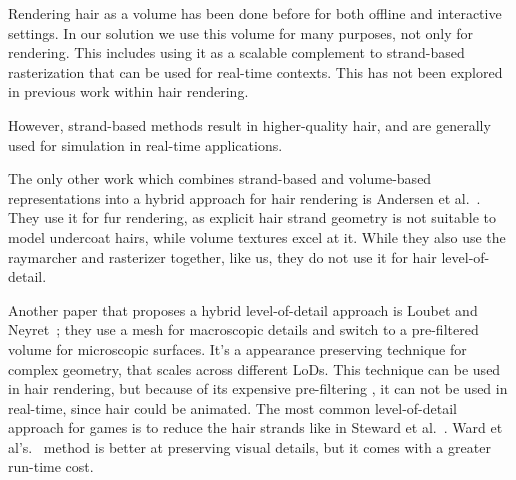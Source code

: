 \documentclass{egpubl}
\begin{document}


Rendering hair as a volume has been done before for both offline \cite{petrovic2005volumetric, moon2008efficient, xing2015efficient} and interactive \cite{ren2010interactive, xing2012real} settings. In our solution we use this volume for many purposes, not only for rendering. This includes using it as a scalable complement to strand-based rasterization that can be used for real-time contexts. This has not been explored in previous work within hair rendering.

However, strand-based methods result in higher-quality hair, and are generally used for simulation \cite{han2014hair} in real-time applications.


The only other work which combines strand-based and volume-based representations into a hybrid approach for hair rendering is Andersen et al.~\cite{andersen2016hybrid}. They use it for fur rendering, as explicit hair strand geometry is not suitable to model undercoat hairs, while volume textures excel at it. While they also use the raymarcher and rasterizer together, like us, they do not use it for hair level-of-detail.


Another paper that proposes a hybrid level-of-detail approach is Loubet and Neyret~\cite{loubet2017hybrid}; they use a mesh for macroscopic details and switch to a pre-filtered volume for microscopic surfaces. It's a appearance preserving technique for complex geometry, that scales across different LoDs. This technique can be used in hair rendering, but because of its expensive pre-filtering \cite{heitz2015sggx}, it can not be used in real-time, since hair could be animated. The most common level-of-detail approach for games is to reduce the hair strands like in Steward et al.~\cite{steward2015augmented}. Ward et al's.~\cite{ward2003modeling} method is better at preserving visual details, but it comes with a greater run-time cost.

\end{document}
